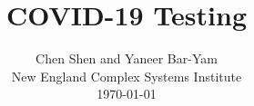 \documentclass[onecolumn,journal]{IEEEtran}
\begin{document}
\title{\color{Brown} COVID-19 Testing \\
\vspace{-0.35ex}}
\author{Chen Shen and Yaneer Bar-Yam \\ New England Complex Systems Institute \\
 \today 
  \vspace{-14ex} \\ 

   
\bigskip
\bigskip

\textbf{}
 }
    
\maketitle


\flushbottom %



\thispagestyle{empty} %




\renewcommand{\thefootnote}{\fnsymbol{footnote}}

\end{document}
